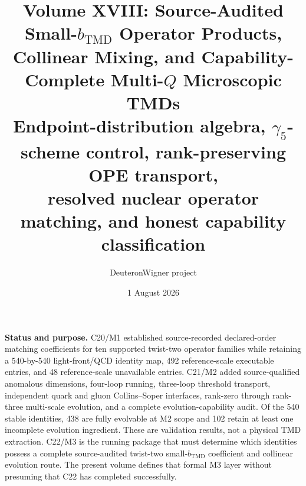 \documentclass[11pt]{article}
\title{\vspace{-1.0cm}
{\color{navy}\bfseries Volume XVIII: Source-Audited Small-\(b_{\mathrm{TMD}}\) Operator Products,\\[2mm]
Collinear Mixing, and Capability-Complete Multi-\(Q\) Microscopic TMDs}\\[4mm]
\large Endpoint-distribution algebra, \(\gamma_5\)-scheme control, rank-preserving OPE transport,\\
resolved nuclear operator matching, and honest capability classification}
\author{DeuteronWigner project}
\date{1 August 2026}
\begin{document}
\maketitle

\begin{center}
\begin{minipage}{0.94\textwidth}
\colorbox{softblue}{\parbox{0.96\textwidth}{
\textbf{Status and purpose.}
C20/M1 established source-recorded declared-order matching coefficients for ten supported twist-two operator families while retaining a 540-by-540 light-front/QCD identity map, 492 reference-scale executable entries, and 48 reference-scale unavailable entries.  C21/M2 added source-qualified anomalous dimensions, four-loop running, three-loop threshold transport, independent quark and gluon Collins--Soper interfaces, rank-zero through rank-three multi-scale evolution, and a complete evolution-capability audit.  Of the 540 stable identities, 438 are fully evolvable at M2 scope and 102 retain at least one incomplete evolution ingredient.  These are validation results, not a physical TMD extraction.  C22/M3 is the running package that must determine which identities possess a complete source-audited twist-two small-\(b_{\mathrm{TMD}}\) coefficient and collinear evolution route.  The present volume defines that formal M3 layer without presuming that C22 has completed successfully.
}}
\end{minipage}
\end{center}
\end{document}
